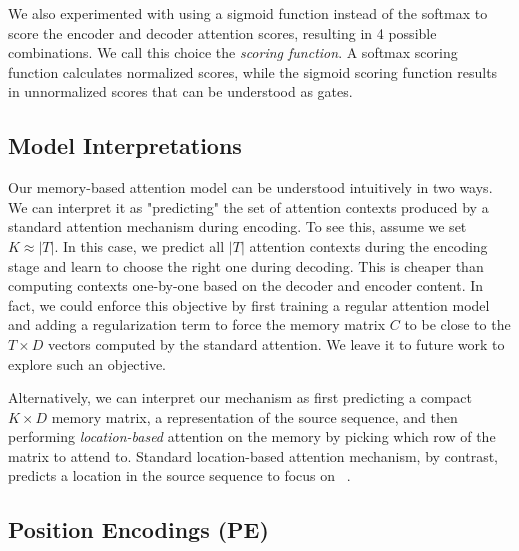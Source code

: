 \documentclass[11pt,letterpaper]{article}
\begin{document}
We also experimented with using a sigmoid function instead of the softmax to score the encoder and decoder attention scores, resulting in 4 possible combinations. We call this choice the \emph{scoring function}. A softmax scoring function calculates normalized scores, while the sigmoid scoring function results in unnormalized scores that can be understood as gates.



\subsection{Model Interpretations}

Our memory-based attention model can be understood intuitively in two ways. We can interpret it as "predicting" the set of attention contexts produced by a standard attention mechanism during encoding. To see this, assume we set $K \approx |T|$. In this case, we predict all $|T|$ attention contexts during the encoding stage and learn to choose the right one during decoding. This is cheaper than computing contexts one-by-one based on the decoder and encoder content. In fact, we could enforce this objective by first training a regular attention model and adding a regularization term to force the memory matrix $C$ to be close to the $T\times D$ vectors computed by the standard attention. We leave it to future work to explore such an objective.

Alternatively, we can interpret our mechanism as first predicting a compact $K \times D$ memory matrix, a representation of the source sequence, and then performing \textit{location-based} attention on the memory by picking which row of the matrix to attend to. Standard location-based attention mechanism, by contrast, predicts a location in the source sequence to focus on ~\cite{Luong:2015, Xu:2015}.

\subsection{Position Encodings (PE)}
\end{document}
